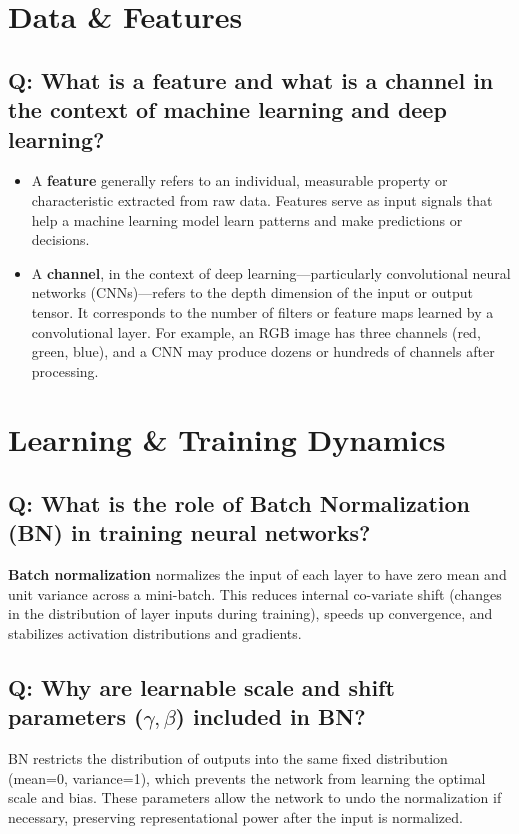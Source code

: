 \documentclass[11pt]{article}
\begin{document}
\section{Data \& Features}

\subsection*{Q: What is a feature and what is a channel in the context of machine learning and deep learning?}
\begin{itemize}
	\item A \textbf{feature} generally refers to an individual, measurable property or characteristic extracted from raw data. Features serve as input signals that help a machine learning model learn patterns and make predictions or decisions.

	\item A \textbf{channel}, in the context of deep learning—particularly convolutional neural networks (CNNs)—refers to the depth dimension of the input or output tensor. It corresponds to the number of filters or feature maps learned by a convolutional layer. For example, an RGB image has three channels (red, green, blue), and a CNN may produce dozens or hundreds of channels after processing.
\end{itemize}

\section{Learning \& Training Dynamics}

\subsection*{Q: What is the role of Batch Normalization (BN) in training neural networks?}
\textbf{Batch normalization} normalizes the input of each layer to have zero mean and unit variance across a mini-batch. This reduces internal co-variate shift (changes in the distribution of layer inputs during training), speeds up convergence, and stabilizes activation distributions and gradients.

\subsection*{Q: Why are learnable scale and shift parameters (\(\gamma, \beta\)) included in BN?}
BN restricts the distribution of outputs into the same fixed distribution (mean=0, variance=1), which prevents the network from learning the optimal scale and bias. These parameters allow the network to undo the normalization if necessary, preserving representational power after the input is normalized.
\end{document}
